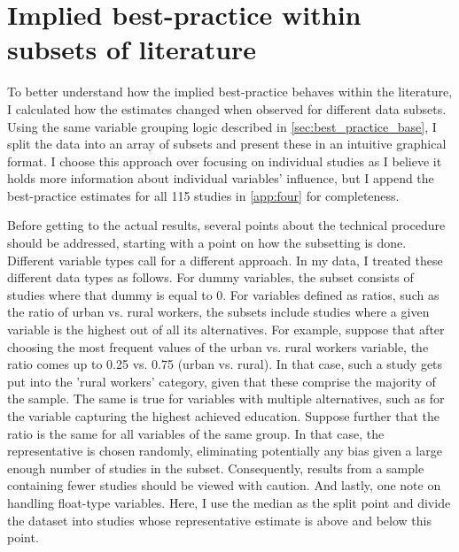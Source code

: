 \section{Implied best-practice within subsets of literature}
\label{sec:best_practice_subsets}

To better understand how the implied best-practice behaves within the literature, I calculated how the estimates changed when observed for different data subsets. Using the same variable grouping logic described in \autoref{sec:best_practice_base}, I split the data into an array of subsets and present these in an intuitive graphical format. I choose this approach over focusing on individual studies as I believe it holds more information about individual variables' influence, but I append the best-practice estimates for all 115 studies in \autoref{app:four} for completeness.

Before getting to the actual results, several points about the technical procedure should be addressed, starting with a point on how the subsetting is done. Different variable types call for a different approach. In my data, I treated these different data types as follows. For dummy variables, the subset consists of studies where that dummy is equal to 0. For variables defined as ratios, such as the ratio of urban vs. rural workers, the subsets include studies where a given variable is the highest out of all its alternatives. For example, suppose that after choosing the most frequent values of the urban vs. rural workers variable, the ratio comes up to 0.25 vs. 0.75 (urban vs. rural). In that case, such a study gets put into the 'rural workers' category, given that these comprise the majority of the sample. The same is true for variables with multiple alternatives, such as for the variable capturing the highest achieved education. Suppose further that the ratio is the same for all variables of the same group. In that case, the representative is chosen randomly, eliminating potentially any bias given a large enough number of studies in the subset. Consequently, results from a sample containing fewer studies should be viewed with caution. And lastly, one note on handling float-type variables. Here, I use the median as the split point and divide the dataset into studies whose representative estimate is above and below this point.


